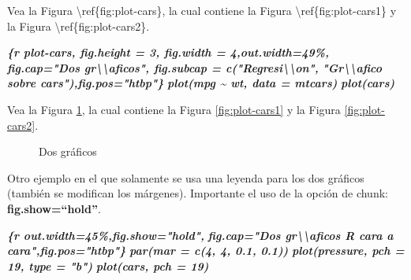 \documentclass[12pt,a4paper,]{book}
\newenvironment{Shaded}{\begin{snugshade}}{\end{snugshade}}
\newcommand{\InformationTok}[1]{\textcolor[rgb]{0.56,0.35,0.01}{\textbf{\textit{#1}}}}
\newcommand{\NormalTok}[1]{#1}
\numberwithin{dummy}{section}
\theoremstyle{ocrenumbox}
\theoremstyle{blacknumex}
\theoremstyle{blacknumbox}
\theoremstyle{ocrenum}
\theoremstyle{ocrenum}
\begin{document}
\begin{Shaded}
\begin{Highlighting}[]

\NormalTok{Vea la Figura \textbackslash{}ref\{fig:plot{-}cars\}, la cual contiene la Figura }
\NormalTok{\textbackslash{}ref\{fig:plot{-}cars1\} y la Figura \textbackslash{}ref\{fig:plot{-}cars2\}.}

\InformationTok{\textasciigrave{}\textasciigrave{}\textasciigrave{}\{r plot{-}cars, fig.height = 3, fig.width = 4,out.width=\textquotesingle{}49\%\textquotesingle{}, }
\InformationTok{fig.cap="Dos gr\textbackslash{}\textbackslash{}\textquotesingle{}aficos", fig.subcap = c("Regresi\textbackslash{}\textbackslash{}\textquotesingle{}on", }
\InformationTok{"Gr\textbackslash{}\textbackslash{}\textquotesingle{}afico sobre cars"),fig.pos="htbp"\}}
\InformationTok{plot(mpg \textasciitilde{} wt, data = mtcars)}
\InformationTok{plot(cars)}
\InformationTok{\textasciigrave{}\textasciigrave{}\textasciigrave{}}
\end{Highlighting}
\end{Shaded}

Vea la Figura \ref{fig:plot-cars}, la cual contiene la Figura
\ref{fig:plot-cars1} y la Figura \ref{fig:plot-cars2}.

\begin{figure}[htbp]
 
 {\centering {}
 
 }
 
 \caption{Dos gr\'aficos}\label{fig:plot-cars}
 \end{figure}

Otro ejemplo en el que solamente se usa una leyenda para los dos
gráficos (también se modifican los márgenes). Importante el uso de la
opción de chunk: \textbf{fig.show=``hold''}.

\begin{Shaded}
\begin{Highlighting}[]
\InformationTok{\textasciigrave{}\textasciigrave{}\textasciigrave{}\{r out.width=\textquotesingle{}45\%\textquotesingle{},fig.show="hold",}
\InformationTok{        fig.cap="Dos gr\textbackslash{}\textbackslash{}\textquotesingle{}aficos R cara a cara",fig.pos="htbp"\}}
\InformationTok{par(mar = c(4, 4, 0.1, 0.1))}
\InformationTok{plot(pressure, pch = 19, type = "b")}
\InformationTok{plot(cars, pch = 19)}
\InformationTok{\textasciigrave{}\textasciigrave{}\textasciigrave{}}
\end{Highlighting}
\end{Shaded}
\end{document}
